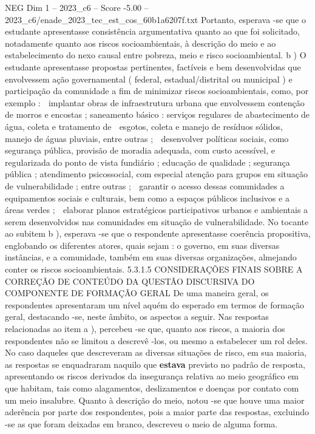 \begin{textsample}{NEG Dim 1 – 2023\_c6 – Score -5.00 – 2023\_c6/enade\_2023\_tec\_est\_cos\_60b1a6207f.txt}
Portanto, esperava -se que o estudante apresentasse consistência argumentativa quanto ao que foi solicitado, notadamente quanto aos riscos socioambientais, à descrição do meio e ao estabelecimento do nexo causal entre pobreza, meio e risco socioambiental. b ) O estudante apresentasse propostas pertinentes, factíveis e bem desenvolvidas que envolvessem ação governamental ( federal, estadual/distrital ou municipal ) e participação da comunidade a fim de minimizar riscos socioambientais, como, por exemplo :  implantar obras de infraestrutura urbana que envolvessem contenção de morros e encostas ; saneamento básico : serviços regulares de abastecimento de água, coleta e tratamento de  esgotos, coleta e manejo de resíduos sólidos, manejo de águas pluviais, entre outras ;  desenvolver políticas sociais, como segurança pública, provisão de moradia adequada, com custo acessível, e regularizada do ponto de vista fundiário ; educação de qualidade ; segurança pública ; atendimento psicossocial, com especial atenção para grupos em situação de vulnerabilidade ; entre outras ;  garantir o acesso dessas comunidades a equipamentos sociais e culturais, bem como a espaços públicos inclusivos e a áreas verdes ;  elaborar planos estratégicos participativos urbanos e ambientais a serem desenvolvidos nas comunidades em situação de vulnerabilidade.
No tocante ao subitem b ), esperava -se que o respondente apresentasse coerência propositiva, englobando os diferentes atores, quais sejam : o governo, em suas diversas instâncias, e a comunidade, também em suas diversas organizações, almejando conter os riscos socioambientais. 5.3.1.5 CONSIDERAÇÕES FINAIS SOBRE A CORREÇÃO DE CONTEÚDO DA QUESTÃO DISCURSIVA DO COMPONENTE DE FORMAÇÃO GERAL De uma maneira geral, os respondentes apresentaram um nível aquém do esperado em termos de formação geral, destacando -se, neste âmbito, os aspectos a seguir.
Nas respostas relacionadas ao item a ), percebeu -se que, quanto aos riscos, a maioria dos respondentes não se limitou a descrevê -los, ou mesmo a estabelecer um rol deles.
No caso daqueles que descreveram as diversas situações de risco, em sua maioria, as respostas se enquadraram naquilo que \textbf{estava} previsto no padrão de resposta, apresentando os riscos derivados da insegurança relativa ao meio geográfico em que habitam, tais como alagamentos, deslizamentos e doenças por contato com um meio insalubre.
Quanto à descrição do meio, notou -se que houve uma maior aderência por parte dos respondentes, pois a maior parte das respostas, excluindo -se as que foram deixadas em branco, descreveu o meio de alguma forma.

\end{textsample}
